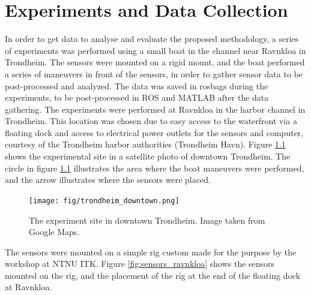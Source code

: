 
\chapter{Experiments and Data Collection}
In order to get data to analyse and evaluate the proposed methodology, a series of experiments was performed using a small boat in the channel near Ravnkloa in Trondheim. The sensors were mounted on a rigid mount, and the boat performed a series of maneuvers in front of the sensors, in order to gather sensor data to be post-processed and analyzed. The data was saved in rosbags during the experiments, to be post-processed in ROS and MATLAB after the data gathering.
The experiments were performed at Ravnkloa in the harbor channel in Trondheim. This location was chosen due to easy access to the waterfront via a floating dock and access to electrical power outlets for the sensors and computer, courtesy of the Trondheim harbor authorities (Trondheim Havn). Figure \ref{fig:trondheim_sentrum} shows the experimental site in a satellite photo of downtown Trondheim. The circle in figure \ref{fig:trondheim_sentrum} illustrates the area where the boat maneuvers were performed, and the arrow illustrates where the sensors were placed.
\begin{figure}[!htb]
	\centering
	\texttt{[image: fig/trondheim\_downtown.png]}
	\caption{The experiment site in downtown Trondheim. Image taken from Google Maps.}
	\label{fig:trondheim_sentrum}
\end{figure}
The sensors were mounted on a simple rig custom made for the purpose by the workshop at NTNU ITK. Figure \ref{fig:sensors_ravnkloa} shows the sensors mounted on the rig, and the placement of the rig at the end of the floating dock at Ravnkloa.
